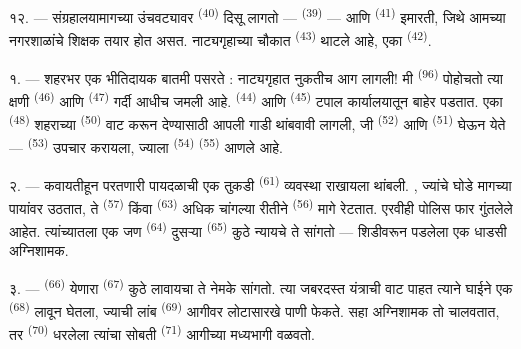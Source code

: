 १२. --- संग्रहालयामागच्या उंचवट्यावर  \textsuperscript{(40)} दिसू लागतो —
 \textsuperscript{(39)} — आणि 
\textsuperscript{(41)} इमारती, जिथे आमच्या नगरशाळांचे शिक्षक तयार होत असत. नाट्यगृहाच्या चौकात
 \textsuperscript{(43)} थाटले आहे, एका 
\textsuperscript{(42)}.

\VUsaut{5.0mm}
\VUsaut{3.0mm}

\VUsaut{3.4mm}

१. --- शहरभर एक भीतिदायक बातमी पसरते : नाट्यगृहात नुकतीच आग लागली! मी 
\textsuperscript{(96)} पोहोचतो त्या क्षणी  \textsuperscript{(46)} आणि
 \textsuperscript{(47)} गर्दी आधीच जमली आहे. 
\textsuperscript{(44)} आणि  \textsuperscript{(45)} टपाल कार्यालयातून
बाहेर पडतात. एका  \textsuperscript{(48)} शहराच्या 
\textsuperscript{(50)} वाट करून देण्यासाठी आपली गाडी थांबवावी लागली, जी 
\textsuperscript{(52)} आणि  \textsuperscript{(51)} घेऊन येते — 
\textsuperscript{(53)} उपचार करायला, ज्याला  \textsuperscript{(54)}
 \textsuperscript{(55)} आणले आहे.

२. --- कवायतीहून परतणारी पायदळाची एक तुकडी 
\textsuperscript{(61)} व्यवस्था राखायला थांबली. , ज्यांचे घोडे मागच्या
पायांवर उठतात, ते  \textsuperscript{(57)} किंवा 
\textsuperscript{(63)} अधिक चांगल्या रीतीने  \textsuperscript{(56)} मागे
रेटतात. एरवीही पोलिस फार गुंतलेले आहेत. त्यांच्यातला एक जण 
\textsuperscript{(64)} दुसऱ्या  \textsuperscript{(65)} कुठे न्यायचे ते
सांगतो — शिडीवरून पडलेला एक धाडसी अग्निशामक.

३. ---  \textsuperscript{(66)} येणारा 
\textsuperscript{(67)} कुठे लावायचा ते नेमके सांगतो. त्या जबरदस्त यंत्राची वाट पाहत त्याने
घाईने एक  \textsuperscript{(68)} लावून घेतला, ज्याची लांब 
\textsuperscript{(69)} आगीवर लोटासारखे पाणी फेकते. सहा अग्निशामक तो चालवतात, तर 
\textsuperscript{(70)} धरलेला त्यांचा सोबती  \textsuperscript{(71)} आगीच्या
मध्यभागी वळवतो.

